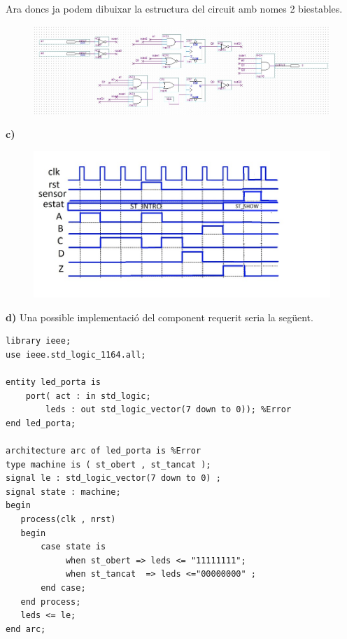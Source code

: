 \documentclass[12pt, a4papre]{article}
\begin{document}
	Ara doncs ja podem dibuixar la estructura del circuit amb nomes 2 biestables.
	
	\begin{figure}[H]
		\begin{center}
		\includegraphics[width=140mm]{DisenyB.jpeg}
		\end{center}
	\end{figure}
	
	\textbf{c)}
	
	\begin{figure}[H]
		\begin{center}
		\includegraphics[width=130mm]{cronogramaC.jpeg}
		\end{center}
	\end{figure}
	
	\textbf{d)} Una possible implementació del component requerit seria la següent.
	
	\begin{lstlisting}[style=vhdl, frame=single, basicstyle=\small]
library ieee;
use ieee.std_logic_1164.all;

entity led_porta is
    port( act : in std_logic;  
        leds : out std_logic_vector(7 down to 0)); %Error
end led_porta;

architecture arc of led_porta is %Error
type machine is ( st_obert , st_tancat );
signal le : std_logic_vector(7 down to 0) ;  
signal state : machine;
begin
   process(clk , nrst)
   begin
       case state is
            when st_obert => leds <= "11111111";
            when st_tancat  => leds <="00000000" ;
       end case;
   end process;
   leds <= le;
end arc;
	\end{lstlisting}
\end{document}

